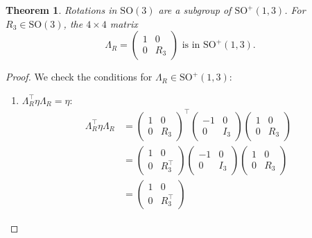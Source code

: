 \documentclass{amsart}
\newtheorem{theorem}{Theorem}[section]
\theoremstyle{definition}
\theoremstyle{remark}
\begin{document}
\begin{theorem}\label{thm:so3_rotations_in_so13}
  Rotations in $\mathrm{SO}(3)$ are a subgroup of $\mathrm{SO}^+(1,3)$.
  For $R_3\in\mathrm{SO}(3)$, the $4 \times 4$ matrix
  \begin{equation*}
    \Lambda_R =
    \begin{pmatrix}
      1 & 0 \\
      0 & R_3
    \end{pmatrix} \text{ is in } \mathrm{SO}^+(1,3).
  \end{equation*}
\end{theorem}
\begin{proof}
  We check the conditions for $\Lambda_R \in \mathrm{SO}^+(1,3)$:
  \begin{enumerate}
      \item $\Lambda_R^\top \eta \Lambda_R = \eta$:
        \begin{align*}
          \Lambda_R^\top\eta \Lambda_R &=
          \begin{pmatrix}
            1 & 0 \\
            0 & R_3
          \end{pmatrix}^\top
          \begin{pmatrix}
            -1 & 0 \\
            0 & I_3
          \end{pmatrix}
          \begin{pmatrix}
            1 & 0 \\
            0 & R_3
          \end{pmatrix} \\
          &=
          \begin{pmatrix}
            1 & 0 \\
            0 & R_3^\top
          \end{pmatrix}
          \begin{pmatrix}
            -1 & 0 \\
            0 & I_3
          \end{pmatrix}
          \begin{pmatrix}
            1 & 0 \\
            0 & R_3
          \end{pmatrix} \\
          &=
          \begin{pmatrix}
            1 & 0 \\
            0 & R_3^\top
          \end{pmatrix}

\end{align*}
\end{enumerate}
\end{proof}
\end{document}
